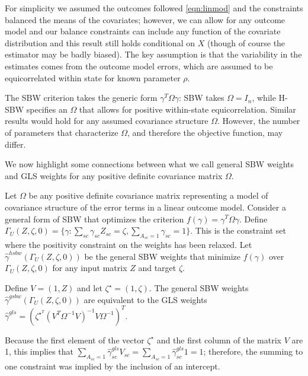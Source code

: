 \begin{remark}
    For simplicity we assumed the outcomes followed \eqref{eqn:linmod} and the constraints balanced the means of the covariates; however, we can allow for any outcome model and our balance constraints can include any function of the covariate distribution and this result still holds conditional on $X$ (though of course the estimator may be badly biased). The key assumption is that the variability in the estimates comes from the outcome model errors, which are assumed to be equicorrelated within state for known parameter $\rho$.
\end{remark}

\begin{remark}
    The SBW criterion takes the generic form $\gamma^T\Omega\gamma$: SBW takes $\Omega = I_n$, while H-SBW specifies an $\Omega$ that allows for positive within-state equicorrelation. Similar results would hold for any assumed covariance structure $\Omega$. However, the number of parameters that characterize $\Omega$, and therefore the objective function, may differ.
\end{remark}

We now highlight some connections between what we call general SBW weights and GLS weights for any positive definite covariance matrix $\Omega$.

\begin{proposition}\label{cl5}
    Let $\Omega$ be any positive definite covariance matrix representing a model of covariance structure of the error terms in a linear outcome model. Consider a general form of SBW that optimizes the criterion $f(\gamma) = \gamma^T\Omega\gamma$. Define $\Gamma_U(Z, \zeta, 0) = \{\gamma: \sum_{sc}\gamma_{sc}Z_{sc} = \zeta, \sum_{A_{sc} = 1}\gamma_{sc} = 1\}$. This is the constraint set where the positivity constraint on the weights has been relaxed. Let $\hat{\gamma}^{hsbw}(\Gamma_U(Z, \zeta, 0))$ be the general SBW weights that minimize $f(\gamma)$ over $\Gamma_U(Z, \zeta, 0)$ for any input matrix $Z$ and target $\zeta$.
    
    Define $V = (1, Z)$ and let $\zeta^\star = (1, \zeta)$. The general SBW weights $\hat{\gamma}^{gsbw}(\Gamma_U(Z, \zeta, 0))$ are equivalent to the GLS weights $\hat{\gamma}^{gls} = (\zeta^\star^T(V^T\Omega^{-1}V)^{-1}V\Omega^{-1})^T$. 
\end{proposition}


\begin{remark}
    Because the first element of the vector $\zeta^\star$ and the first column of the matrix $V$ are 1, this implies that $\sum_{A_{sc} = 1}\hat{\gamma}_{sc}^{gls}V_{sc} = \sum_{A_{sc} = 1}\hat{\gamma}^{gls}_{sc}1 = 1$; therefore, the summing to one constraint was implied by the inclusion of an intercept.
\end{remark}

